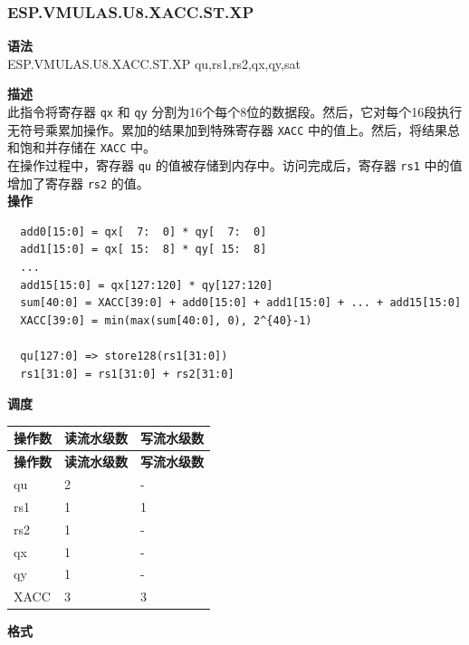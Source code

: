 \newpage

\newpage
\subsubsection{ESP.VMULAS.U8.XACC.ST.XP}\label{instruction:ESPVMULASU8XACCSTXP}
\textbf{语法}\\
ESP.VMULAS.U8.XACC.ST.XP qu,rs1,rs2,qx,qy,sat

\textbf{描述}\\

此指令将寄存器 \lstinline{qx} 和 \lstinline{qy} 分割为16个每个8位的数据段。然后，它对每个16段执行无符号乘累加操作。累加的结果加到特殊寄存器 \lstinline{XACC} 中的值上。然后，将结果总和饱和并存储在 \lstinline{XACC} 中。\\ 在操作过程中，寄存器 \lstinline{qu} 的值被存储到内存中。访问完成后，寄存器 \lstinline{rs1} 中的值增加了寄存器 \lstinline{rs2} 的值。\\
\textbf{操作}
\begin{lstlisting}
  add0[15:0] = qx[  7:  0] * qy[  7:  0]
  add1[15:0] = qx[ 15:  8] * qy[ 15:  8]
  ...
  add15[15:0] = qx[127:120] * qy[127:120]
  sum[40:0] = XACC[39:0] + add0[15:0] + add1[15:0] + ... + add15[15:0]
  XACC[39:0] = min(max(sum[40:0], 0), 2^{40}-1)

  qu[127:0] => store128(rs1[31:0])
  rs1[31:0] = rs1[31:0] + rs2[31:0]
\end{lstlisting}

\textbf{调度}\\
\begin{longtable}[c]{|l|l|l|}
    \hline
    \rowcolor{lightgray}
    \textbf{操作数} & \textbf{读流水级数} & \textbf{写流水级数} \\\hline
    \endfirsthead
    \hline
    \rowcolor{lightgray}
     \textbf{操作数} & \textbf{读流水级数} & \textbf{写流水级数} \\\hline
    \endhead
    \hline
    \endfoot

    qu & 2 & - \\\hline
    rs1 & 1 & 1 \\\hline
    rs2 & 1 & - \\\hline
     qx & 1 & - \\\hline
     qy & 1 & - \\\hline
     XACC & 3 & 3

\end{longtable}

\textbf{格式}\\

